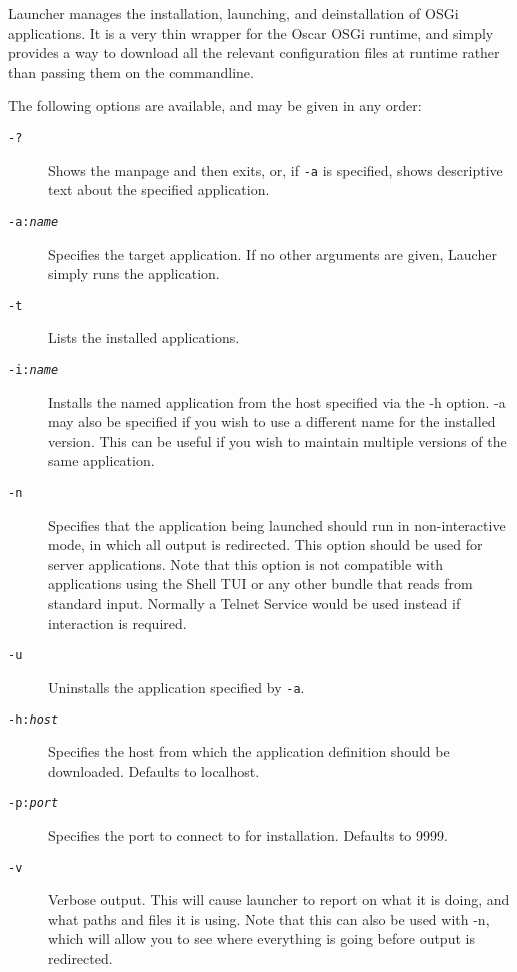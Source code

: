 \documentclass{report}
\begin{document}
Launcher manages the installation, launching, and deinstallation of OSGi 
applications. It is a very thin wrapper for the Oscar OSGi runtime, and simply 
provides a way to download all the relevant configuration files at runtime 
rather than passing them on the commandline.
    
The following options are available, and may be given in any order:
    
\begin{description}    

\item[\tt -?]  Shows the manpage and then exits, or, if {\tt -a} is specified, shows 
descriptive text about the specified application.

\item[\tt -a:{\it name}] Specifies the target application. If no other 
arguments are given, Laucher simply runs the application.

\item[\tt -t]  Lists the installed applications.
  
\item[\tt -i:{\it name}] Installs the named application from the host specified via 
the -h option. -a may also be specified if you wish to use a different name for 
the installed version. This can be useful if you wish to maintain multiple 
versions of the same application.

\item[\tt -n]  Specifies that the application being launched should run in 
non-interactive mode, in which all output is redirected. This option should be 
used for server applications. Note that this option is not compatible with 
applications using the Shell TUI or any other bundle that reads from standard 
input. Normally a Telnet Service would be used instead if interaction is 
required.
    
\item[\tt -u]  Uninstalls the application specified by {\tt -a}.
    
\item[\tt -h:{\it host}] Specifies the host from which the application 
definition should be downloaded. Defaults to localhost.
        
\item[\tt -p:{\it port}] Specifies the port to connect to for installation. 
Defaults to 9999.
            
\item[\tt -v] Verbose output. This will cause launcher to report on what it is 
doing, and what paths and files it is using. Note that this can also be used 
with -n, which will allow you to see where everything is going before output is 
redirected.
            

\end{description}
\end{document}
